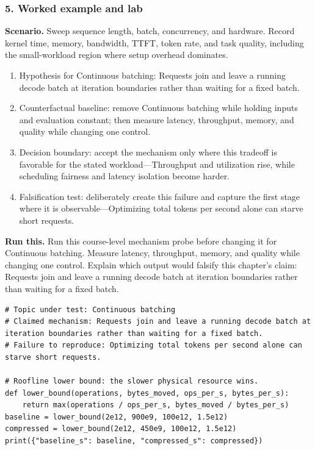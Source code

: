 \subsubsection*{5. Worked example and lab}
\textbf{Scenario.} Sweep sequence length, batch, concurrency, and hardware. Record kernel time, memory, bandwidth, TTFT, token rate, and task quality, including the small-workload region where setup overhead dominates.
\begin{enumerate}
\item Hypothesis for Continuous batching: Requests join and leave a running decode batch at iteration boundaries rather than waiting for a fixed batch.
\item Counterfactual baseline: remove Continuous batching while holding inputs and evaluation constant; then measure latency, throughput, memory, and quality while changing one control.
\item Decision boundary: accept the mechanism only where this tradeoff is favorable for the stated workload—Throughput and utilization rise, while scheduling fairness and latency isolation become harder.
\item Falsification test: deliberately create this failure and capture the first stage where it is observable—Optimizing total tokens per second alone can starve short requests.
\end{enumerate}
\textbf{Run this.} Run this course-level mechanism probe before changing it for Continuous batching. Measure latency, throughput, memory, and quality while changing one control. Explain which output would falsify this chapter's claim: Requests join and leave a running decode batch at iteration boundaries rather than waiting for a fixed batch.
\begin{Verbatim}[fontsize=\scriptsize]
# Topic under test: Continuous batching
# Claimed mechanism: Requests join and leave a running decode batch at iteration boundaries rather than waiting for a fixed batch.
# Failure to reproduce: Optimizing total tokens per second alone can starve short requests.

# Roofline lower bound: the slower physical resource wins.
def lower_bound(operations, bytes_moved, ops_per_s, bytes_per_s):
    return max(operations / ops_per_s, bytes_moved / bytes_per_s)
baseline = lower_bound(2e12, 900e9, 100e12, 1.5e12)
compressed = lower_bound(2e12, 450e9, 100e12, 1.5e12)
print({"baseline_s": baseline, "compressed_s": compressed})
\end{Verbatim}
